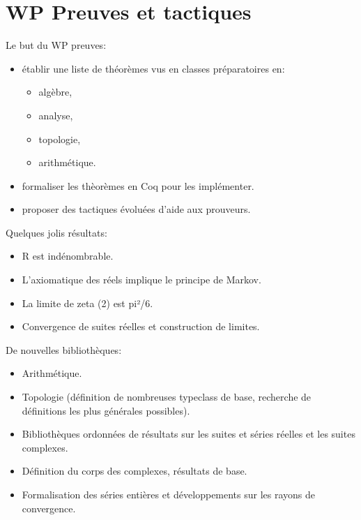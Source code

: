 \documentclass[slidetop]{beamer}
\begin{document}
\section{WP Preuves et tactiques}
\begin{frame}

Le but du WP preuves:
\begin{itemize}
  \item établir une liste de théorèmes vus en classes préparatoires en: 
  \begin{itemize}
    \item algèbre,
    \item analyse,
    \item topologie,
    \item arithmétique.
  \end{itemize}
  \item formaliser les thèorèmes en Coq pour les implémenter.
  \item proposer des tactiques évoluées d'aide aux prouveurs. 
\end{itemize}

\end{frame}


\begin{frame}
 
Quelques jolis résultats:
\begin{itemize}
  \item R est indénombrable.
  \item L'axiomatique des réels implique le principe de Markov.
  \item La limite de zeta (2) est pi²/6.
  \item Convergence de suites réelles et construction de limites.
\end{itemize}
\end{frame}

\begin{frame}
De nouvelles bibliothèques:
\begin{itemize}
  \item Arithmétique.
  \item Topologie (définition de nombreuses typeclass de base, recherche de définitions les plus générales possibles).
  \item Bibliothèques ordonnées de résultats sur les suites et séries réelles et les suites complexes.
  \item Définition du corps des complexes, résultats de base.
  \item Formalisation des séries entières et développements sur les rayons de convergence.
\end{itemize}
\end{frame}
\end{document}
